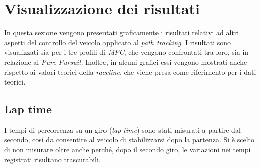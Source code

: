 \section{Visualizzazione dei risultati}
In questa sezione vengono presentati graficamente i risultati relativi ad altri
aspetti del controllo del veicolo applicato al \textit{path tracking}.
I risultati sono visualizzati sia per i tre profili di \textit{MPC}, che vengono confrontati 
tra loro, sia in relazione al \textit{Pure Pursuit}. Inoltre, in alcuni grafici essi vengono 
mostrati anche rispetto ai valori teorici della \textit{raceline}, che viene presa come riferimento per i dati teorici.
\subsection{Lap time}
I tempi di percorrenza su un giro (\textit{lap time}) sono stati misurati a partire
dal secondo, così da consentire al veicolo di stabilizzarsi dopo la partenza.
Si è scelto di non misurare oltre anche perché, dopo il secondo giro, le variazioni nei tempi registrati risultano trascurabili.

